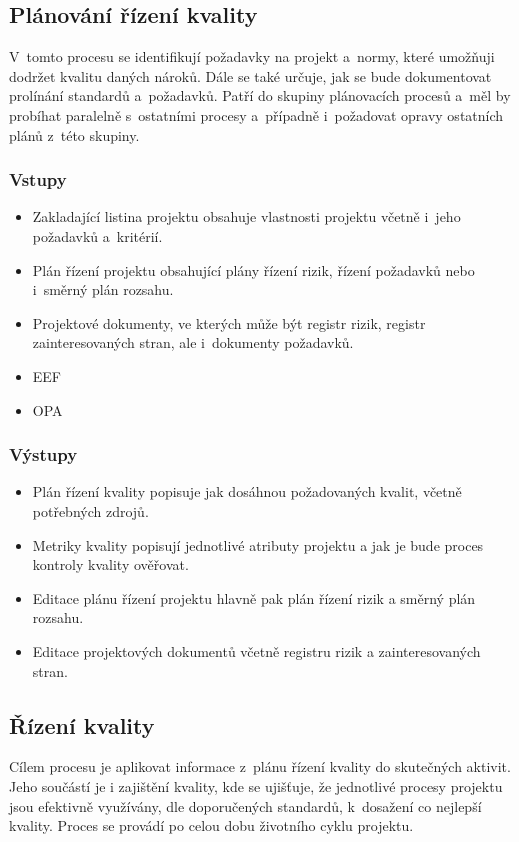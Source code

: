 \subsection*{Plánování řízení kvality}

V~tomto procesu se identifikují požadavky na projekt a~normy, které umožňuji dodržet kvalitu daných nároků. Dále se také určuje, jak se bude dokumentovat prolínání standardů a~požadavků. Patří do skupiny plánovacích procesů a~měl by probíhat paralelně s~ostatními procesy a~případně i~požadovat opravy ostatních plánů z~této skupiny.

\subsubsection*{Vstupy}
\begin{itemize}
    \item Zakladající listina projektu obsahuje vlastnosti projektu včetně i~jeho požadavků a~kritérií.
    \item Plán řízení projektu obsahující plány řízení rizik, řízení požadavků nebo i~směrný plán rozsahu.
    \item Projektové dokumenty, ve kterých může být registr rizik, registr zainteresovaných stran, ale i~dokumenty požadavků.
    \item EEF
    \item OPA
\end{itemize}
\subsubsection*{Výstupy}
\begin{itemize}
    \item Plán řízení kvality popisuje jak dosáhnou požadovaných kvalit, včetně potřebných zdrojů. 
    \item Metriky kvality popisují jednotlivé atributy projektu a jak je bude proces kontroly kvality ověřovat. 
    \item Editace plánu řízení projektu hlavně pak plán řízení rizik a směrný plán rozsahu.
    \item Editace projektových dokumentů včetně registru rizik a zainteresovaných stran.
\end{itemize}

\subsection*{Řízení kvality}

Cílem procesu je aplikovat informace z~plánu řízení kvality do skutečných aktivit. Jeho součástí je i zajištění kvality, kde se ujišťuje, že jednotlivé procesy projektu jsou efektivně využívány, dle doporučených standardů, k~dosažení co nejlepší kvality. Proces se provádí po celou dobu životního cyklu projektu.


